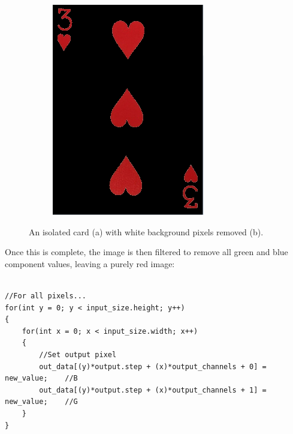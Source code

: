\documentclass[a4paper,12pt,notitlepage]{article}
\begin{document}
\begin{figure}[H]
\begin{subfigure}[b]{0.4\textwidth}
				\includegraphics[width=\textwidth]{chris/image18}
				\caption{}
			\end{subfigure}
			\caption{An isolated card (a) with white background pixels removed (b).}
			\label{fig:whitebg}
		\end{figure}

		Once this is complete, the image is then filtered to remove all green and blue component values, leaving a purely red image:
		
		\begin{lstlisting}

//For all pixels...
for(int y = 0; y < input_size.height; y++)
{
    for(int x = 0; x < input_size.width; x++)
    {
        //Set output pixel              
        out_data[(y)*output.step + (x)*output_channels + 0] = new_value;    //B
        out_data[(y)*output.step + (x)*output_channels + 1] = new_value;    //G 
    }
}
		\end{lstlisting}
\end{document}
